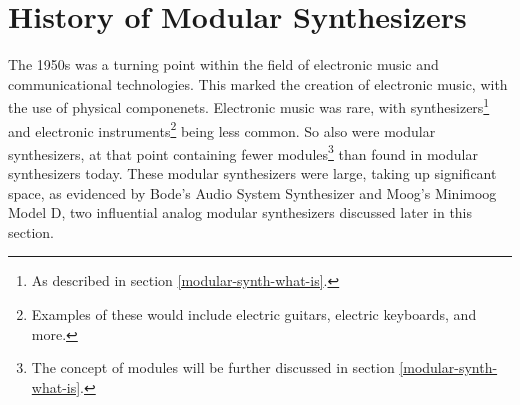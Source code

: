 \section[History of Modular Synthesizers]{History of Modular Synthesizers}\label{section:mod-synth-history}

The 1950s was a turning point within the field of electronic music and communicational technologies. This marked the creation of electronic music, with the use of physical componenets. Electronic music was rare, with synthesizers\footnote{As described in section \ref{modular-synth-what-is}.} and electronic instruments\footnote{Examples of these would include electric guitars, electric keyboards, and more.} being less common. So also were modular synthesizers, at that point containing fewer modules\footnote{The concept of modules will be further discussed in section \ref{modular-synth-what-is}.} than found in modular synthesizers today. These modular synthesizers were large, taking up significant space, as evidenced by Bode's Audio System Synthesizer and Moog's Minimoog Model D, two influential analog modular synthesizers discussed later in this section.

